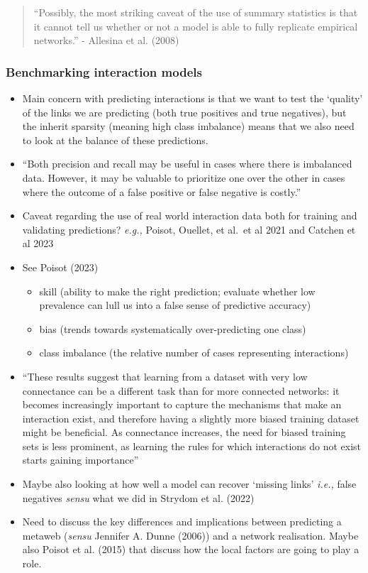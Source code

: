 \documentclass[
]{agujournal2019}
\begin{document}
\begin{quote}
``Possibly, the most striking caveat of the use of summary statistics is
that it cannot tell us whether or not a model is able to fully replicate
empirical networks.'' - Allesina et al. (2008)
\end{quote}

\subsubsection{Benchmarking interaction
models}\label{benchmarking-interaction-models}

\begin{itemize}
\item
  Main concern with predicting interactions is that we want to test the
  `quality' of the links we are predicting (both true positives and true
  negatives), but the inherit sparsity (meaning high class imbalance)
  means that we also need to look at the balance of these predictions.
\item
  ``Both precision and recall may be useful in cases where there is
  imbalanced data. However, it may be valuable to prioritize one over
  the other in cases where the outcome of a false positive or false
  negative is costly.''
\item
  Caveat regarding the use of real world interaction data both for
  training and validating predictions? \emph{e.g.,} Poisot, Ouellet, et
  al.~et al 2021 and Catchen et al 2023
\item
  See Poisot (2023)

  \begin{itemize}
  \item
    skill (ability to make the right prediction; evaluate whether low
    prevalence can lull us into a false sense of predictive accuracy)
  \item
    bias (trends towards systematically over-predicting one class)
  \item
    class imbalance (the relative number of cases representing
    interactions)
  \end{itemize}
\item
  ``These results suggest that learning from a dataset with very low
  connectance can be a different task than for more connected networks:
  it becomes increasingly important to capture the mechanisms that make
  an interaction exist, and therefore having a slightly more biased
  training dataset might be beneficial. As connectance increases, the
  need for biased training sets is less prominent, as learning the rules
  for which interactions do not exist starts gaining importance''
\item
  Maybe also looking at how well a model can recover `missing links'
  \emph{i.e.,} false negatives \emph{sensu} what we did in Strydom et
  al. (2022)
\item
  Need to discuss the key differences and implications between
  predicting a metaweb (\emph{sensu} Jennifer A. Dunne (2006)) and a
  network realisation. Maybe also Poisot et al. (2015) that discuss how
  the local factors are going to play a role.
\end{itemize}
\end{document}
